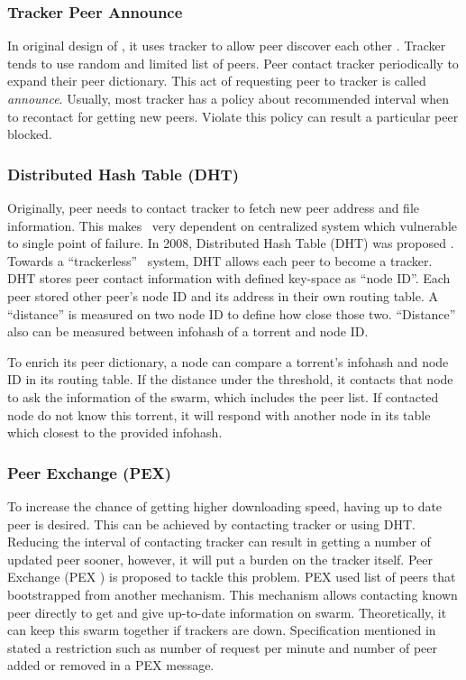 \subsubsection{Tracker Peer Announce}
In original design of \bt, it uses tracker to allow peer discover each other \cite{2003:bittorrent:cohen}. Tracker tends to use random and limited list of peers. Peer contact tracker periodically to expand their peer dictionary. This act of requesting peer to tracker is called \textit{announce}.	Usually, most tracker has a policy about recommended interval when to recontact for getting new peers. Violate this policy can result a particular peer blocked.

\subsubsection{Distributed Hash Table (DHT)}
Originally, peer needs to contact tracker to fetch new peer address and file information. This makes \bt~very dependent on centralized system which vulnerable to single point of failure. In 2008, Distributed Hash Table (DHT) was proposed \cite{2008:dht:loewenstern}. Towards a ``trackerless'' \bt~system, DHT allows each peer to become a tracker. DHT stores peer contact information with defined key-space as ``node ID''. Each peer stored other peer's node ID and its address in their own routing table. A ``distance'' is measured on two node ID to define how close those two. ``Distance'' also can be measured between infohash of a torrent and node ID.

To enrich its peer dictionary, a node can compare a torrent's infohash and node ID in its routing table. If the distance under the threshold, it contacts that node to ask the information of the swarm, which includes the peer list. If contacted node do not know this torrent, it will respond with another node in its table which closest to the provided infohash.

\subsubsection{Peer Exchange (PEX)}
To increase the chance of getting higher downloading speed, having up to date peer is desired. This can be achieved by contacting tracker or using DHT. Reducing the interval of contacting tracker can result in getting a number of updated peer sooner, however, it will put a burden on the tracker itself. Peer Exchange (PEX )\cite{2015:PEX:the8472} is proposed to tackle this problem. PEX used list of peers that bootstrapped from another mechanism. This mechanism allows contacting known peer directly to get and give up-to-date information on swarm. Theoretically, it can keep this swarm together if trackers are down. Specification mentioned in \cite{2015:PEX:the8472} stated a restriction such as number of request per minute and number of peer added or removed in a PEX message.

